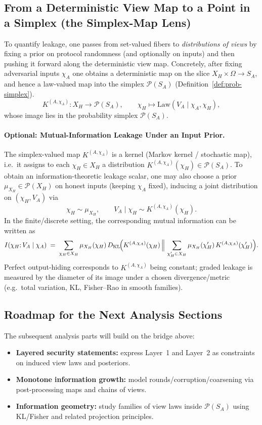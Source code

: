 \documentclass[11pt,a4paper]{article}
\theoremstyle{definition}
\theoremstyle{plain}
\newcommand{\Prob}{\mathcal{P}}
\begin{document}
\subsection{From a Deterministic View Map to a Point in a Simplex (the Simplex-Map Lens)}
To quantify leakage, one passes from set-valued fibers to \emph{distributions of views} by fixing a prior on protocol randomness (and optionally on inputs) and then pushing it forward along the deterministic view map.
Concretely, after fixing adversarial inputs $\chi_A$ one obtains a deterministic map on the slice $X_H\times \Omega \to S_A$, and hence a law-valued map into the simplex $\Prob(S_A)$ (Definition~\ref{def:prob-simplex}).
\[
K^{(A,\chi_A)}:X_H \to \Prob(S_A),\qquad \chi_H\mapsto \mathrm{Law}(V_A\mid \chi_A,\chi_H),
\]
whose image lies in the probability simplex $\Prob(S_A)$.

\paragraph{Optional: Mutual-Information Leakage Under an Input Prior.}
The simplex-valued map $K^{(A,\chi_A)}$ is a kernel (Markov kernel / stochastic map), i.e.\ it assigns to each $\chi_H\in X_H$ a distribution $K^{(A,\chi_A)}(\chi_H)\in\Prob(S_A)$.
To obtain an information-theoretic leakage scalar, one may also choose a prior $\mu_{X_H}\in\Prob(X_H)$ on honest inputs (keeping $\chi_A$ fixed), inducing a joint distribution on $(\chi_H,V_A)$ via
\[
\chi_H\sim \mu_{X_H},\qquad V_A \mid \chi_H \sim K^{(A,\chi_A)}(\chi_H).
\]
In the finite/discrete setting, the corresponding mutual information can be written as
\[
I(\chi_H;V_A\mid \chi_A)
\;=\;
\sum_{\chi_H\in X_H}\mu_{X_H}(\chi_H)\,
D_{\mathrm{KL}}\!\Bigl(K^{(A,\chi_A)}(\chi_H)\,\Big\|\,\sum_{\chi_H'\in X_H}\mu_{X_H}(\chi_H')\,K^{(A,\chi_A)}(\chi_H')\Bigr).
\]
Perfect output-hiding corresponds to $K^{(A,\chi_A)}$ being constant; graded leakage is measured
by the diameter of its image under a chosen divergence/metric (e.g.\ total variation, KL, Fisher--Rao in smooth families).

\subsection{Roadmap for the Next Analysis Sections}
The subsequent analysis parts will build on the bridge above:
\begin{itemize}
\item \textbf{Layered security statements:} express Layer~1 and Layer~2 as constraints on induced view laws and posteriors.
\item \textbf{Monotone information growth:} model rounds/corruption/coarsening via post-processing maps and chains of views.
\item \textbf{Information geometry:} study families of view laws inside $\Prob(S_A)$ using KL/Fisher and related projection principles.
\end{itemize}
\end{document}
